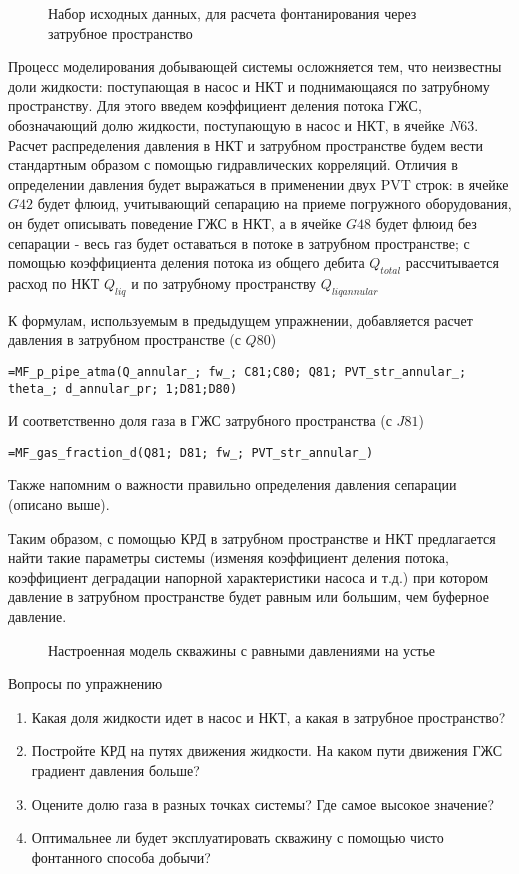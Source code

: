 \begin{figure}[h!]
	\center{\texttt{[image: Ex110\_1]}}
	\caption{Набор исходных данных, для расчета фонтанирования через затрубное пространство}
	\label{ris:Ex110_1}
\end{figure}

Процесс моделирования добывающей системы осложняется тем, что неизвестны доли жидкости: поступающая в насос и НКТ и поднимающаяся по затрубному пространству. Для этого введем коэффициент деления потока ГЖС, обозначающий долю жидкости, поступающую в насос и НКТ, в ячейке $N63$. Расчет распределения давления в НКТ и затрубном пространстве будем вести стандартным образом с помощью гидравлических корреляций. Отличия в определении давления будет выражаться в применении двух PVT строк: в ячейке $G42$ будет флюид, учитывающий сепарацию на приеме погружного оборудования, он будет описывать поведение ГЖС в НКТ, а в ячейке $G48$ будет флюид без сепарации - весь газ будет оставаться в потоке в затрубном пространстве; с помощью коэффициента деления потока из общего дебита $Q_{total}$ рассчитывается расход по НКТ $Q_{liq}$ и по затрубному  пространству $Q_{liq annular}$

К формулам, используемым в предыдущем упражнении, добавляется расчет давления в затрубном пространстве (с $Q80$)

{ \small  \texttt{=MF\_p\_pipe\_atma(Q\_annular\_; fw\_; C81;C80; Q81; PVT\_str\_annular\_; theta\_; d\_annular\_pr; 1;D81;D80)
}}

И соответственно доля газа в ГЖС затрубного пространства (с $J81$) 

{ \small  \texttt{=MF\_gas\_fraction\_d(Q81; D81; fw\_; PVT\_str\_annular\_)
}}

Также напомним о важности правильно определения давления сепарации (описано выше). 

Таким образом, с помощью КРД в затрубном пространстве и НКТ предлагается найти такие параметры системы (изменяя коэффициент деления потока, коэффициент деградации напорной характеристики насоса и т.д.) при котором давление в затрубном пространстве будет равным или большим, чем буферное давление.

\begin{figure}[h!]
	\center{\texttt{[image: Ex110\_2]}}
	\caption{Настроенная модель скважины с равными давлениями на устье}
	\label{ris:Ex110_2}
\end{figure}

Вопросы по упражнению
\begin{enumerate}
	\item  Какая доля жидкости идет в насос и НКТ, а какая в затрубное пространство?
	\item  Постройте КРД на путях движения жидкости. На каком пути движения ГЖС градиент давления больше?
	\item Оцените долю газа в разных точках системы? Где самое высокое значение?
	\item Оптимальнее ли будет эксплуатировать скважину с помощью чисто фонтанного способа добычи?
\end{enumerate}



